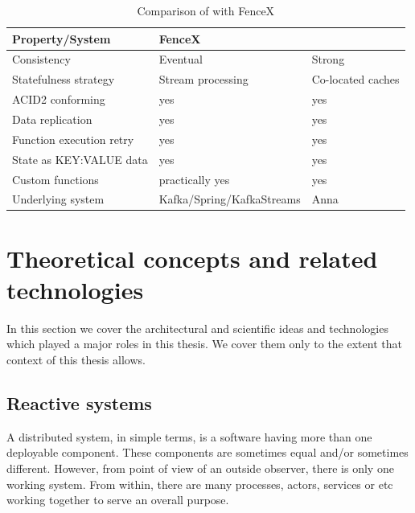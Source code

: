 \documentclass[a4]{report}
\begin{document}
    \begin{table}[h!]
        \begin{tabular}{ |l|l|l| }
            \hline
            Property/System          & FenceX                    & \cite{Functions-as-a-Service-2020} \\
            \hline
            Consistency              & Eventual                  & Strong                             \\
            Statefulness strategy    & Stream processing         & Co-located caches                  \\
            ACID2 conforming         & yes                       & yes                                \\
            Data replication         & yes                       & yes                                \\
            Function execution retry & yes                       & yes                                \\
            State as KEY:VALUE data  & yes                       & yes                                \\
            Custom functions         & practically yes           & yes                                \\
            Underlying system        & Kafka/Spring/KafkaStreams & Anna                               \\
            \hline
        \end{tabular}
        \caption{Comparison of  \cite{Functions-as-a-Service-2020} with FenceX}
        \label{table:fencex-comp}
    \end{table}


    \chapter{Theoretical concepts and related technologies}
    In this section we cover the architectural and scientific ideas and technologies which played a major roles in
    this thesis.
    We cover them only to the extent that context of this thesis allows.


    \section{Reactive systems}
    A distributed system, in simple terms, is a software having more than one deployable component.
    These components are sometimes equal and/or sometimes different.
    However, from point of view of an outside observer, there is only one working system.
    From within, there are many processes, actors, services or etc working together to serve an overall purpose.
\end{document}
